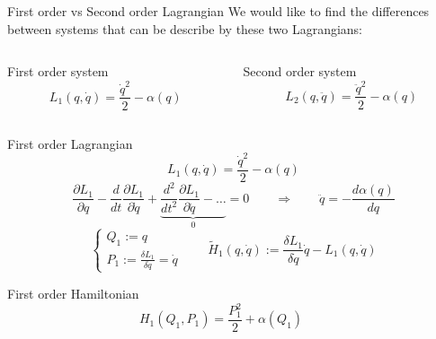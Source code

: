 \documentclass[10pt]{beamer}
\begin{document}
  \begin{frame}{First order vs Second order Lagrangian}
    We would like to find the differences between systems that can be
    describe by these two Lagrangians:
    \vspace{0.5em}
    \begin{columns}
      \begin{column}{0.4\textwidth}
        \begin{center}
          \alert{First order system}
          \begin{equation*}
            L_1(q, \dot{q}) = \frac{\dot{q}^2}{2} - \alpha(q)
          \end{equation*}
        \end{center}
      \end{column}
      \begin{column}{0.4\textwidth}
        \begin{center}
          \alert{Second order system}
          \begin{equation*}
            L_2(q, \ddot{q}) = \frac{\ddot{q}^2}{2} - \alpha(q)
          \end{equation*}
        \end{center}
      \end{column}
    \end{columns}
  \end{frame}

  \begin{frame}{First order Lagrangian}
    \begin{equation*}
      L_1(q, \dot{q}) = \frac{\dot{q}^2}{2} - \alpha(q)
    \end{equation*}
    \vspace{0.2em}
    \begin{equation*} \label{eq: first-order_motion_eq_lagr}
      \frac{\partial L_1}{\partial q} -
      \frac{d}{dt}\frac{\partial L_1}{\partial \dot{q}} +
      \underbrace{
      \frac{d^2}{dt^2}\frac{\partial L_1}{\partial \ddot{q}} - \ldots }_0 = 0
      \qquad \Rightarrow \qquad
      \ddot{q} = - \frac{d\alpha(q)}{dq}
    \end{equation*}
    \begin{equation*}
      \begin{cases}
        Q_1 := q \\
        P_1 := \frac{\delta L_1}{\delta \dot{q}} = \dot{q}
      \end{cases}
      \qquad
      \tilde{H}_1(q, \dot{q}) :=
      \frac{\delta L_1}{\delta \dot{q}} \dot{q} - L_1(q, \dot{q})
    \end{equation*}
    \begin{block}{First order Hamiltonian}
      \begin{equation*} \label{eq: first-order_motion_eq_ham}
        H_1(Q_1, P_1) = \frac{P_1^2}{2} + \alpha(Q_1) \qquad
      \end{equation*}
    \end{block}
  \end{frame}
\end{document}
